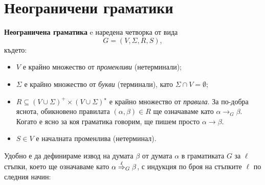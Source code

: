 \section{Неограничени граматики}\label{sect:unrestricted-grammar}

{\bf Неограничена граматика} e наредена четворка от вида
\[G = (V, \Sigma, R, S),\]
където:
\begin{itemize}
\item
  $V$ е крайно множество от {\em променливи} (нетерминали);
\item
  $\Sigma$ е крайно множество от {\em букви} (терминали), като $\Sigma \cap V = \emptyset$;
\item
  $R \subseteq (V\cup\Sigma)^+ \times (V \cup \Sigma)^\star$ е крайно множество от {\em правила}.
  За по-добра яснота, обикновено правилата $(\alpha, \beta) \in R$ ще означаваме като 
  $\alpha \to_G \beta$. Когато е ясно за коя граматика говорим, ще пишем просто $\alpha \to \beta$.
\item
  $S \in V$ е началната променлива (нетерминал). 
\end{itemize}

Удобно е да дефинираме извод на думата $\beta$ от думата $\alpha$ в граматиката $G$ за $\ell$ стъпки, което ще означаваме като $\alpha \stackrel{{\ell}}{\Rightarrow}_G \beta$,
с индукция по броя на стъпките $\ell$ по следния начин:

